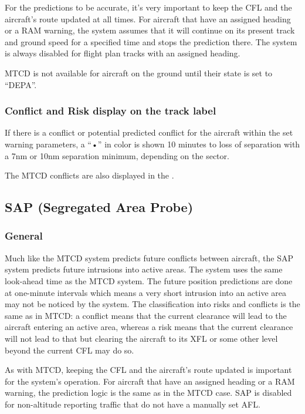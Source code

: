 \documentclass[a4paper,oneside,11pt]{memoir}
\begin{document}
\bigskip

For the predictions to be accurate, it’s very important to keep the CFL and the aircraft’s route updated at all times. For aircraft that have an assigned heading or a RAM warning, the system assumes that it will continue on its present track and ground speed for a specified time and stops the prediction there. The system is always disabled for flight plan tracks with an assigned heading.

\bigskip

MTCD is not available for aircraft on the ground until their state is set to “DEPA”.

\subsubsection*{Conflict and Risk display on the track label}

If there is a conflict or potential predicted conflict for the aircraft within the set warning parameters, a “•” in  color is shown 10 minutes to loss of separation with a 7nm or 10nm separation minimum, depending on the sector.

\bigskip

The MTCD conflicts are also displayed in the .

\subsection{SAP (Segregated Area Probe)}
\label{tool:SAP}
\subsubsection*{General}

Much like the MTCD system predicts future conflicts between aircraft, the SAP system predicts future intrusions into active areas. The system uses the same look-ahead time as the MTCD system. The future position predictions are done at one-minute intervals which means a very short intrusion into an active area may not be noticed by the system. The classification into risks and conflicts is the same as in MTCD: a conflict means that the current clearance will lead to the aircraft entering an active area, whereas a risk means that the current clearance will not lead to that but clearing the aircraft to its XFL or some other level beyond the current CFL may do so.

\bigskip

As with MTCD, keeping the CFL and the aircraft’s route updated is important for the system’s operation. For aircraft that have an assigned heading or a RAM warning, the prediction logic is the same as in the MTCD case. SAP is disabled for non-altitude reporting traffic that do not have a manually set AFL.
\end{document}
